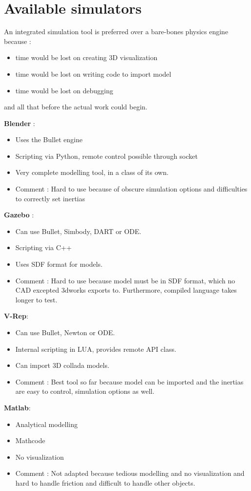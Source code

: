\section{Available simulators}
An integrated simulation tool is preferred over a bare-bones physics engine because :
\begin{itemize}
\item time would be lost on creating 3D visualization
\item time would be lost on writing code to import model
\item time would be lost on debugging
\end{itemize}
and all that before the actual work could begin.

\textbf{Blender\cite{Bruyninckx04}
} : \begin{itemize}
\item Uses the Bullet engine
\item Scripting via Python, remote control possible through socket
\item Very complete modelling tool, in a class of its own.
\item Comment : Hard to use because of obscure simulation options and difficulties to correctly set inertias
\end{itemize}

\textbf{Gazebo} : \begin{itemize}
\item Can use Bullet, Simbody, DART or ODE.
\item Scripting via C++
\item Uses SDF format for models.
\item Comment : Hard to use because model must be in SDF format, which no CAD excepted 3dworks exports to. Furthermore, compiled language takes longer to test.
\end{itemize}

\textbf{V-Rep}: \begin{itemize}
\item Can use Bullet, Newton or ODE.
\item Internal scripting in LUA, provides remote API class.
\item Can import 3D collada models.
\item Comment : Best tool so far because model can be imported and the inertias are easy to control, simulation options as well.
\end{itemize}

\textbf{Matlab}: \begin{itemize}
\item Analytical modelling
\item Mathcode
\item No visualization
\item Comment : Not adapted because tedious modelling and no visualization and hard to handle friction and difficult to handle other objects.
\end{itemize}

